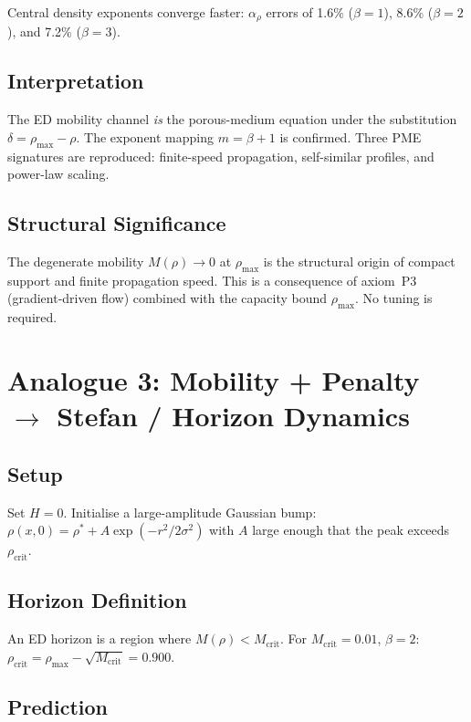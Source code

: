 \documentclass[11pt]{article}
\begin{document}
Central density exponents converge faster: \(\alpha_\rho\) errors of 1.6\% (\(\beta=1\)), 8.6\% (\(\beta=2\)), and 7.2\% (\(\beta=3\)).

\subsection{Interpretation}

The ED mobility channel \emph{is} the porous-medium equation under the substitution \(\delta = \rho_{\max} - \rho\). The exponent mapping \(m = \beta + 1\) is confirmed. Three PME signatures are reproduced: finite-speed propagation, self-similar profiles, and power-law scaling.

\subsection{Structural Significance}

The degenerate mobility \(M(\rho) \to 0\) at \(\rho_{\max}\) is the structural origin of compact support and finite propagation speed. This is a consequence of axiom~P3 (gradient-driven flow) combined with the capacity bound \(\rho_{\max}\). No tuning is required.

\section{Analogue 3: Mobility + Penalty \texorpdfstring{$\to$}{->} Stefan / Horizon Dynamics}

\subsection{Setup}

Set \(H = 0\). Initialise a large-amplitude Gaussian bump: \(\rho(x,0) = \rho^* + A\exp(-r^2/2\sigma^2)\) with \(A\) large enough that the peak exceeds \(\rho_{\mathrm{crit}}\).

\subsection{Horizon Definition}

An ED horizon is a region where \(M(\rho) < M_{\mathrm{crit}}\). For \(M_{\mathrm{crit}} = 0.01\), \(\beta = 2\): \(\rho_{\mathrm{crit}} = \rho_{\max} - \sqrt{M_{\mathrm{crit}}} = 0.900\).

\subsection{Prediction}
\end{document}
